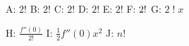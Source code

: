 ﻿\documentclass[11pt]{ctexart}
\begin{document}
A: $2!$ \quad B: $2{!}$ \quad C: $2\mathord{!}$ \quad D: $2\text{!}$ \quad E: $2\mathrm{!}$ \quad F: $2\char33$ \quad G: $2\;!\;x$

H: $\frac{f''(0)}{2!}$ \quad I: $\tfrac{1}{2}f''(0)x^{2}$ \quad J: $n!$
\end{document}
